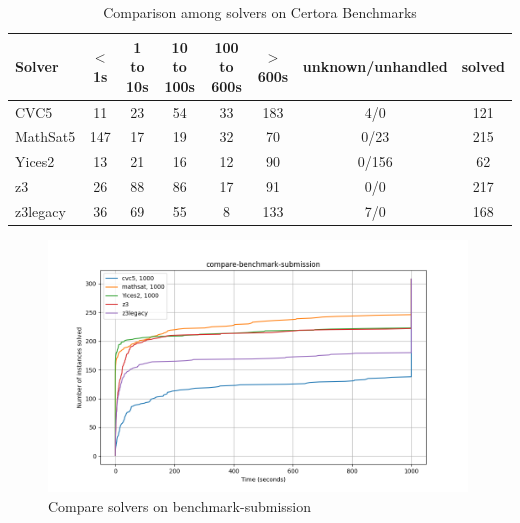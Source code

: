 \begin{table}
  \begin{tabular}{|l|c|c|c|c|c|c|c|}
    \hline
    Solver & $<$ 1s & 1 to 10s & 10 to 100s & 100 to 600s & $>$ 600s & unknown/unhandled & solved \\
    \hline
    CVC5 & 11 & 23 & 54 & 33 & 183 & 4/0 & 121 \\
    \hline
    MathSat5 & 147 & 17 & 19 & 32 & 70 & 0/23 & 215 \\
    \hline
    Yices2 & 13 & 21 & 16 & 12 & 90 & 0/156 & 62 \\
    \hline
    z3 & 26 & 88 & 86 & 17 & 91 & 0/0 & 217 \\
    \hline
    z3legacy & 36 & 69 & 55 & 8 & 133 & 7/0 & 168 \\
    \hline
    \end{tabular}
  \caption{Comparison among solvers on Certora Benchmarks \label{tab:compare-benchmark-submission}}
\end{table}
\begin{figure}[htbp]
  \centering
  \includegraphics[width=0.99\textwidth]{../data/compare-benchmark-submission.png}
  \caption{Compare solvers on benchmark-submission}
  \label{fig:compare-benchmark-submission}
\end{figure}

